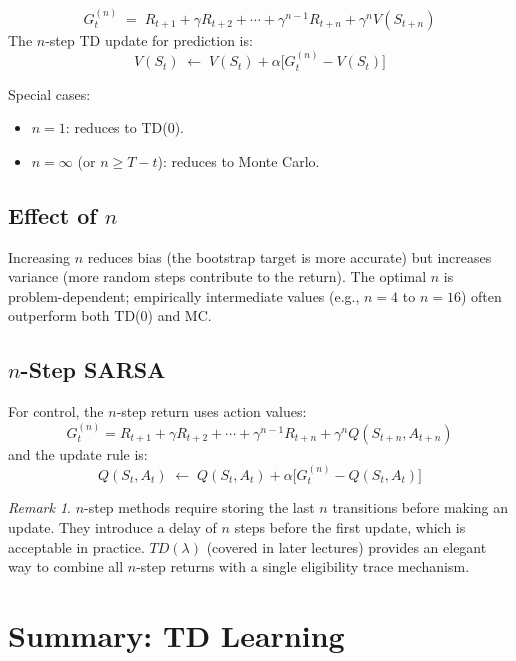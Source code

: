 \documentclass[11pt,a4paper]{article}
\theoremstyle{definition}
\theoremstyle{plain}
\theoremstyle{remark}
\newtheorem*{remark}{Remark}
\begin{document}
\begin{tcolorbox}[colback=blue!5!white, colframe=blue!60!black, title={$n$-Step Return}]
\[
    G_t^{(n)} \;=\; R_{t+1} + \gamma R_{t+2} + \cdots + \gamma^{n-1} R_{t+n} + \gamma^n V(S_{t+n})
\]
The $n$-step TD update for prediction is:
\[
    V(S_t) \;\leftarrow\; V(S_t) + \alpha\bigl[G_t^{(n)} - V(S_t)\bigr]
\]
\end{tcolorbox}

Special cases:
\begin{itemize}
    \item $n = 1$: reduces to TD(0).
    \item $n = \infty$ (or $n \geq T - t$): reduces to Monte Carlo.
\end{itemize}

\subsection{Effect of $n$}

Increasing $n$ reduces bias (the bootstrap target is more accurate) but increases variance (more random steps contribute to the return). The optimal $n$ is problem-dependent; empirically intermediate values (e.g., $n = 4$ to $n = 16$) often outperform both TD(0) and MC.

\subsection{$n$-Step SARSA}

For control, the $n$-step return uses action values:
\[
    G_t^{(n)} = R_{t+1} + \gamma R_{t+2} + \cdots + \gamma^{n-1} R_{t+n} + \gamma^n Q(S_{t+n}, A_{t+n})
\]
and the update rule is:
\[
    Q(S_t, A_t) \;\leftarrow\; Q(S_t, A_t) + \alpha\bigl[G_t^{(n)} - Q(S_t, A_t)\bigr]
\]

\begin{remark}
$n$-step methods require storing the last $n$ transitions before making an update. They introduce a delay of $n$ steps before the first update, which is acceptable in practice. $TD(\lambda)$ (covered in later lectures) provides an elegant way to combine all $n$-step returns with a single eligibility trace mechanism.
\end{remark}

\section{Summary: TD Learning}
\end{document}
